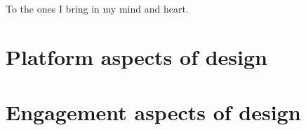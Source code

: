 \documentclass[draft,10pt,twoside,openright,english]{book}
\begin{document}
\chapter*{}
\begin{flushright}
\null{}
To the ones I bring in my mind and heart.
\null
\end{flushright}
\cleardoublepage

\tableofcontents
\listoffigures
\listoftables
\printglossaries
\cleardoublepage
\newpage

\setcounter{page}{1}
\cleardoublepage




\part{Platform aspects of design}


\part{Engagement aspects of design}








\cleardoublepage
{}




\cleardoublepage
\appendix


\end{document}

